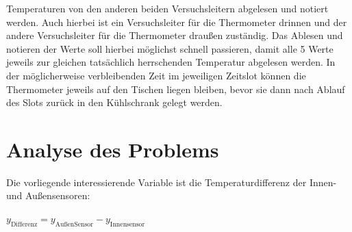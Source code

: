 \documentclass[ ngerman, fontsize= 12pt, paper=a4, headings=big, titlepage=true]{article}
\begin{document}
Temperaturen von den anderen beiden Versuchsleitern abgelesen und notiert werden. Auch hierbei ist ein Versuchsleiter für die Thermometer drinnen und der andere Versuchsleiter für die Thermometer draußen zuständig. Das Ablesen und notieren der Werte soll hierbei möglichst schnell passieren, damit alle 5 Werte jeweils zur gleichen tatsächlich herrschenden Temperatur abgelesen werden. In der möglicherweise verbleibenden Zeit im jeweiligen Zeitslot können die Thermometer jeweils auf den Tischen liegen bleiben, bevor sie dann nach Ablauf des Slots zurück in den Kühlschrank gelegt werden.
\section{Analyse des Problems}
%		
%	
%	
%	
%	

Die vorliegende interessierende Variable ist die Temperaturdifferenz der Innen-und Außensensoren:\\
\begin{center}
	$y_{\text{Differenz}} = y_{\text{AußenSensor}}-y_{\text{Innensensor}} $
\end{center}
\end{document}
